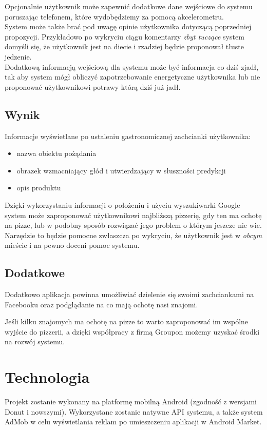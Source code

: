 \documentclass[a4paper,twoside,11pt]{article}
\begin{document}
Opcjonalnie użytkownik może zapewnić dodatkowe dane wejściowe do systemu poruszając telefonem, które wydobędziemy za pomocą akcelerometru. \\

System może także brać pod uwagę opinie użytkownika dotyczącą poprzedniej propozycji. Przykładowo po wykryciu ciągu komentarzy \emph{zbyt tuczące} system domyśli się, że użytkownik jest na diecie i rzadziej będzie proponował tłuste jedzenie. \\

Dodatkową informacją wejściową dla systemu może być informacja co dziś zjadł, tak aby system mógł obliczyć zapotrzebowanie energetyczne użytkownika lub nie proponować użytkownikowi potrawy którą dziś już jadł.

\newpage
\subsection{Wynik}
Informacje wyświetlane po ustaleniu gastronomicznej zachcianki użytkownika:
\begin{itemize}
\item nazwa obiektu pożądania
\item obrazek wzmacniający głód i utwierdzający w słuszności predykcji
\item opis produktu
\end{itemize}

Dzięki wykorzystaniu informacji o położeniu i użyciu wyszukiwarki Google system może zaproponować użytkownikowi
najbliższą pizzerię, gdy ten ma ochotę na pizze, lub w podobny sposób rozwiązać jego problem o którym jeszcze nie wie. Narzędzie to będzie pomocne zwłaszcza po wykryciu, że użytkownik jest w \emph{obcym} mieście
i na pewno doceni pomoc systemu.
\subsection{Dodatkowe}
Dodatkowo aplikacja powinna umożliwiać dzielenie się swoimi zachciankami na Facebooku oraz podglądanie na co mają ochotę nasi znajomi.

Jeśli kilku znajomych ma ochotę na pizze to warto zaproponować im wspólne wyjście do pizzerii, a dzięki współpracy z firmą Groupon możemy uzyskać środki na rozwój systemu.
\section{Technologia}
Projekt zostanie wykonany na platformę mobilną Android (zgodność z wersjami Donut i nowszymi). Wykorzystane zostanie natywne API systemu, a także system AdMob w celu wyświetlania reklam po umieszczeniu aplikacji w Android Market. \\
\end{document}

